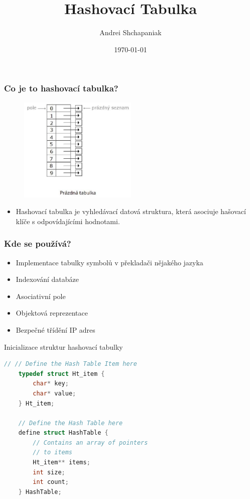 \documentclass{beamer}
\title{Hashovací Tabulka}
\author{Andrei Shchapaniak}
\institute{VUT FIT}
\date{\today}
\begin{document}
    \frame{\titlepage}
    
    \begin{frame}
        \frametitle{Co je to hashovací tabulka?}
        \begin{figure}
            \includegraphics[height=5.0cm]{hash_table.eps}
            \centering
        \end{figure}

        \begin{itemize}
            \item Hashovací tabulka je vyhledávací datová struktura, která asociuje hašovací klíče s odpovídajícími hodnotami.
        \end{itemize}
    \end{frame}

    \begin{frame}
        \frametitle{Kde se používá?}
        \begin{itemize}
            \item Implementace tabulky symbolů v překladači nějakého jazyka
            \item Indexování databáze
            \item Asociativní pole
            \item Objektová reprezentace
            \item Bezpečné třídění IP adres
        \end{itemize}
    \end{frame}

    \begin{frame}[fragile]{Inicializace struktur hashovací tabulky}
        \begin{lstlisting}[language=C]
    // // Define the Hash Table Item here
    typedef struct Ht_item {
        char* key;
        char* value;
    } Ht_item;
    
    // Define the Hash Table here
    define struct HashTable {
        // Contains an array of pointers
        // to items
        Ht_item** items;
        int size;
        int count;
    } HashTable;
        \end{lstlisting}
    \end{frame}
    
\end{document}
